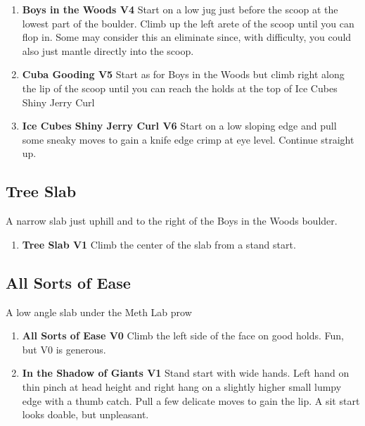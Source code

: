 \begin{enumerate}[resume]
	\item\label{rt:Boys in the Woods} \colorbox{RoyalBlue!20}{\textbf{Boys in the Woods V4    } }
	\newline Start on a low jug just before the scoop at the lowest part of the boulder. Climb up the left arete of the scoop until you can flop in. Some may consider this an eliminate since, with difficulty, you could also just mantle directly into the scoop.\
	\item\label{rt:Cuba Gooding} \colorbox{RoyalBlue!20}{\textbf{Cuba Gooding V5  } }
	\newline Start as for Boys in the Woods but climb right along the lip of the scoop until you can reach the holds at the top of Ice Cubes Shiny Jerry Curl\
	\item\label{rt:Ice Cubes Shiny Jerry Curl} \colorbox{RoyalBlue!20}{\textbf{Ice Cubes Shiny Jerry Curl V6  } }
	\newline Start on a low sloping edge and pull some sneaky moves to gain a knife edge crimp at eye level. Continue straight up.\
\end{enumerate}
\subsection*{Tree Slab}\label{bf:Tree Slab}
A narrow slab just uphill and to the right of the Boys in the Woods boulder.

\begin{enumerate}[resume]
	\item\label{rt:Tree Slab} \colorbox{green!20}{\textbf{Tree Slab V1    } }
	\newline Climb the center of the slab from a stand start.\
\end{enumerate}
\subsection*{All Sorts of Ease}\label{bf:All Sorts of Ease}
A low angle slab under the Meth Lab prow

\begin{enumerate}[resume]
	\item\label{rt:All Sorts of Ease} \colorbox{green!20}{\textbf{All Sorts of Ease V0    } }
	\newline Climb the left side of the face on good holds. Fun, but V0 is generous.\
	\item\label{rt:In the Shadow of Giants} \colorbox{green!20}{\textbf{In the Shadow of Giants V1   } }
	\newline Stand start with wide hands. Left hand on thin pinch at head height and right hang on a slightly higher small lumpy edge with a thumb catch. Pull a few delicate moves to gain the lip. A sit start looks doable, but unpleasant.\
\end{enumerate}
